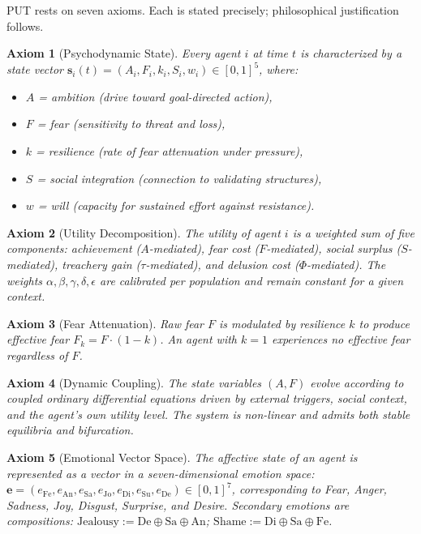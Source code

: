 \documentclass[12pt, a4paper]{article}
\newtheorem{axiom}{Axiom}[section]
\theoremstyle{remark}
\newcommand{\Fk}{F_k}
\begin{document}
PUT rests on seven axioms. Each is stated precisely; philosophical
justification follows.

\begin{axiom}[Psychodynamic State]\label{ax:state}
Every agent $i$ at time $t$ is characterized by a state vector
$\mathbf{s}_i(t) = (A_i, F_i, k_i, S_i, w_i) \in [0,1]^5$, where:
\begin{itemize}[nosep]
    \item $A$ = ambition (drive toward goal-directed action),
    \item $F$ = fear (sensitivity to threat and loss),
    \item $k$ = resilience (rate of fear attenuation under pressure),
    \item $S$ = social integration (connection to validating structures),
    \item $w$ = will (capacity for sustained effort against resistance).
\end{itemize}
\end{axiom}

\begin{axiom}[Utility Decomposition]\label{ax:utility}
The utility of agent $i$ is a weighted sum of five components:
achievement ($A$-mediated), fear cost ($F$-mediated), social surplus
($S$-mediated), treachery gain ($\tau$-mediated), and delusion cost
($\Phi$-mediated). The weights $\alpha, \beta, \gamma, \delta, \epsilon$
are calibrated per population and remain constant for a given context.
\end{axiom}

\begin{axiom}[Fear Attenuation]\label{ax:fear}
Raw fear $F$ is modulated by resilience $k$ to produce effective fear
$\Fk = F \cdot (1 - k)$. An agent with $k = 1$ experiences no
effective fear regardless of $F$.
\end{axiom}

\begin{axiom}[Dynamic Coupling]\label{ax:dynamics}
The state variables $(A, F)$ evolve according to coupled ordinary
differential equations driven by external triggers, social context,
and the agent's own utility level. The system is \emph{non-linear}
and admits both stable equilibria and bifurcation.
\end{axiom}

\begin{axiom}[Emotional Vector Space]\label{ax:emotions}
The affective state of an agent is represented as a vector in a
seven-dimensional emotion space:
$\mathbf{e} = (e_{\text{Fe}}, e_{\text{An}}, e_{\text{Sa}}, e_{\text{Jo}},
e_{\text{Di}}, e_{\text{Su}}, e_{\text{De}}) \in [0,1]^7$,
corresponding to Fear, Anger, Sadness, Joy, Disgust, Surprise, and
Desire. Secondary emotions are compositions: $\text{Jealousy} :=
\text{De} \oplus \text{Sa} \oplus \text{An}$;
$\text{Shame} := \text{Di} \oplus \text{Sa} \oplus \text{Fe}$.
\end{axiom}
\end{document}
